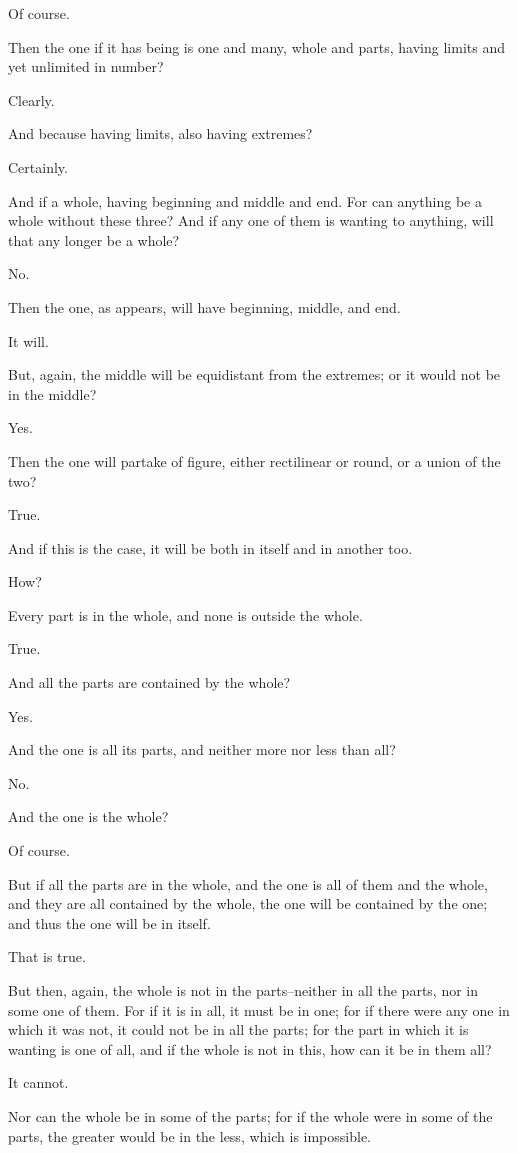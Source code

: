 Of course.

Then the one if it has being is one and many, whole and parts, having
limits and yet unlimited in number?

Clearly.

And because having limits, also having extremes?

Certainly.

And if a whole, having beginning and middle and end. For can anything
be a whole without these three? And if any one of them is wanting to
anything, will that any longer be a whole?

No.

Then the one, as appears, will have beginning, middle, and end.

It will.

But, again, the middle will be equidistant from the extremes; or it
would not be in the middle?

Yes.

Then the one will partake of figure, either rectilinear or round, or a
union of the two?

True.

And if this is the case, it will be both in itself and in another too.

How?

Every part is in the whole, and none is outside the whole.

True.

And all the parts are contained by the whole?

Yes.

And the one is all its parts, and neither more nor less than all?

No.

And the one is the whole?

Of course.

But if all the parts are in the whole, and the one is all of them and
the whole, and they are all contained by the whole, the one will be
contained by the one; and thus the one will be in itself.

That is true.

But then, again, the whole is not in the parts--neither in all the
parts, nor in some one of them. For if it is in all, it must be in one;
for if there were any one in which it was not, it could not be in all
the parts; for the part in which it is wanting is one of all, and if the
whole is not in this, how can it be in them all?

It cannot.

Nor can the whole be in some of the parts; for if the whole were in some
of the parts, the greater would be in the less, which is impossible.

